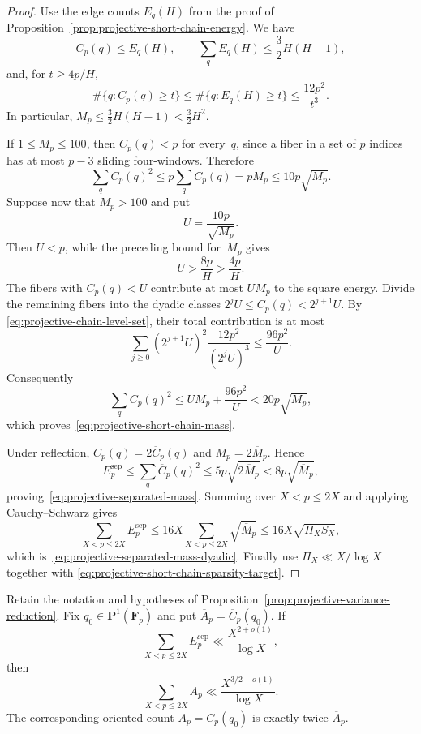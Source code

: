 \begin{proof}
Use the edge counts $E_q(H)$ from the proof of
Proposition~\ref{prop:projective-short-chain-energy}.  We have
\[
 C_p(q)\le E_q(H),
 \qquad
 \sum_qE_q(H)\le\frac32H(H-1),
\]
and, for $t\ge4p/H$,
\begin{equation}
 \#\{q:C_p(q)\ge t\}
 \le\#\{q:E_q(H)\ge t\}
 \le\frac{12p^2}{t^3}.
\label{eq:projective-chain-level-set}
\end{equation}
In particular,
$M_p\le\frac32H(H-1)<\frac32H^2$.

If $1\le M_p\le100$, then $C_p(q)<p$ for every~$q$, since a
fiber in a set of $p$ indices has at most $p-3$ sliding four-windows.
Therefore
\[
 \sum_qC_p(q)^2\le p\sum_qC_p(q)=pM_p
 \le10p\sqrt{M_p}.
\]
Suppose now that $M_p>100$ and put
\[
 U=\frac{10p}{\sqrt{M_p}}.
\]
Then $U<p$, while the preceding bound for~$M_p$ gives
\[
 U>\frac{8p}{H}>\frac{4p}{H}.
\]
The fibers with $C_p(q)<U$ contribute at most $UM_p$ to the
square energy.  Divide the remaining fibers into the dyadic classes
$2^jU\le C_p(q)<2^{j+1}U$.  By
\eqref{eq:projective-chain-level-set}, their total contribution is at
most
\[
 \sum_{j\ge0}(2^{j+1}U)^2
       \frac{12p^2}{(2^jU)^3}
 \le\frac{96p^2}{U}.
\]
Consequently
\[
 \sum_qC_p(q)^2
 \le UM_p+\frac{96p^2}{U}
 <20p\sqrt{M_p},
\]
which proves~\eqref{eq:projective-short-chain-mass}.

Under reflection, $C_p(q)=2\overline C_p(q)$ and
$M_p=2\overline M_p$.  Hence
\[
 E_p^{\mathrm{sep}}
 \le\sum_q\overline C_p(q)^2
 \le5p\sqrt{2\overline M_p}
 <8p\sqrt{\overline M_p},
\]
proving~\eqref{eq:projective-separated-mass}.  Summing over
$X<p\le2X$ and applying Cauchy--Schwarz gives
\[
 \sum_{X<p\le2X}E_p^{\mathrm{sep}}
 \le16X\sum_{X<p\le2X}\sqrt{\overline M_p}
 \le16X\sqrt{\Pi_XS_X},
\]
which is~\eqref{eq:projective-separated-mass-dyadic}.  Finally use
$\Pi_X\ll X/\log X$ together with
\eqref{eq:projective-short-chain-sparsity-target}.
\end{proof}

\begin{corollary}
\label{cor:projective-variance-distinguished}
Retain the notation and hypotheses of
Proposition~\ref{prop:projective-variance-reduction}.  Fix
$q_0\in\mathbf P^1(\mathbf F_p)$ and put
$\overline A_p=\overline C_p(q_0)$.  If
\[
 \sum_{X<p\le2X}E_p^{\mathrm{sep}}
 \ll\frac{X^{2+o(1)}}{\log X},
\]
then
\[
 \sum_{X<p\le2X}\overline A_p
 \ll\frac{X^{3/2+o(1)}}{\log X}.
\]
The corresponding oriented count $A_p=C_p(q_0)$ is exactly twice
$\overline A_p$.
\end{corollary}

